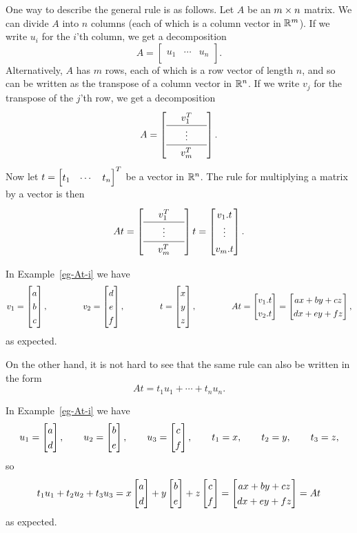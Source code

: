 \documentclass[reqno]{amsart}
\theoremstyle{definition}
\begin{document}
One way to describe the general rule is as follows.  Let $A$ be an
$m\times n$ matrix.  We can divide $A$ into $n$ columns (each of
which is a column vector in ${\mathbb{R}}^m$).  If we write $u_i$ for the $i$'th
column, we get a decomposition
\[ A = \left[\begin{array}{c|c|c}
        && \\ u_1 & \dotsb & u_n \\ &&
       \end{array}\right].
\]
Alternatively, $A$ has $m$ rows, each of which is a row vector
of length $n$, and so can be written as the transpose of a column
vector in ${\mathbb{R}}^n$.  If we write $v_j$ for the transpose of the $j$'th
row, we get a decomposition
\[ \renewcommand{\arraystretch}{1.3}
   A = \left[\begin{array}{ccc}
        & v_1^T & \\ \hline
        & \vdots & \\ \hline
        & v_m^T &
       \end{array}\right].
\]
Now let $t=\bbm t_1 & \dotsb & t_n\ebm^T$ be a vector in ${\mathbb{R}}^n$.  The
rule for multiplying a matrix by a vector is then
\[ \renewcommand{\arraystretch}{1.3}
   At = 
    \left[\begin{array}{ccc}
        & v_1^T & \\ \hline
        & \vdots & \\ \hline
        & v_m^T &
       \end{array}\right] t = 
    \bbm v_1.t \\ \vdots \\ v_m.t \ebm.
\] 

In Example~\ref{eg-At-i} we have 
\[ v_1 = \bbm a \\ b \\ c \ebm, \hspace{4em}
   v_2 = \bbm d \\ e \\ f \ebm, \hspace{4em}
   t   = \bbm x \\ y \\ z \ebm, \hspace{4em}
   At = \bbm v_1.t \\ v_2.t \ebm
      = \bbm ax+by+cz \\ dx+ey+fz \ebm,
\]
as expected.  

On the other hand, it is not hard to see that the same rule can also
be written in the form 
\[ At = t_1u_1 + \dotsb + t_nu_n. \]

In Example~\ref{eg-At-i} we have 
\[ u_1 = \bbm a \\ d \ebm, \qquad
   u_2 = \bbm b \\ e \ebm, \qquad
   u_3 = \bbm c \\ f \ebm, \qquad
   t_1 = x, \qquad
   t_2 = y, \qquad
   t_3 = z,
\]
so 
\[ t_1u_1+t_2u_2+t_3u_3 = 
    x \bbm a \\ d \ebm + 
    y \bbm b \\ e \ebm + 
    z \bbm c \\ f \ebm =
    \bbm ax+by+cz \\ dx+ey+fz \ebm = At
\]
as expected.
\end{document}

